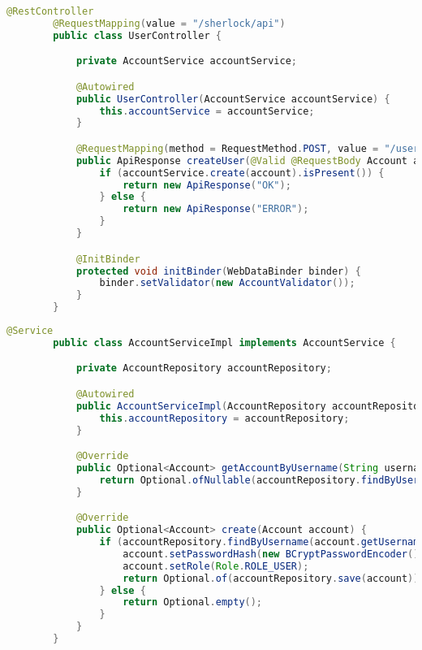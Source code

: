     \newpage
    \begin{lstlisting}[language=java]
        @RestController
        @RequestMapping(value = "/sherlock/api")
        public class UserController {

            private AccountService accountService;

            @Autowired
            public UserController(AccountService accountService) {
                this.accountService = accountService;
            }

            @RequestMapping(method = RequestMethod.POST, value = "/user/create")
            public ApiResponse createUser(@Valid @RequestBody Account account) {
                if (accountService.create(account).isPresent()) {
                    return new ApiResponse("OK");
                } else {
                    return new ApiResponse("ERROR");
                }
            }

            @InitBinder
            protected void initBinder(WebDataBinder binder) {
                binder.setValidator(new AccountValidator());
            }
        }
    \end{lstlisting}

    \newpage
    \begin{lstlisting}[language=java]
        @Service
        public class AccountServiceImpl implements AccountService {

            private AccountRepository accountRepository;

            @Autowired
            public AccountServiceImpl(AccountRepository accountRepository) {
                this.accountRepository = accountRepository;
            }

            @Override
            public Optional<Account> getAccountByUsername(String username) {
                return Optional.ofNullable(accountRepository.findByUsername(username));
            }

            @Override
            public Optional<Account> create(Account account) {
                if (accountRepository.findByUsername(account.getUsername()) == null) {
                    account.setPasswordHash(new BCryptPasswordEncoder().encode(account.getPassword()));
                    account.setRole(Role.ROLE_USER);
                    return Optional.of(accountRepository.save(account));
                } else {
                    return Optional.empty();
                }
            }
        }    
    \end{lstlisting}

